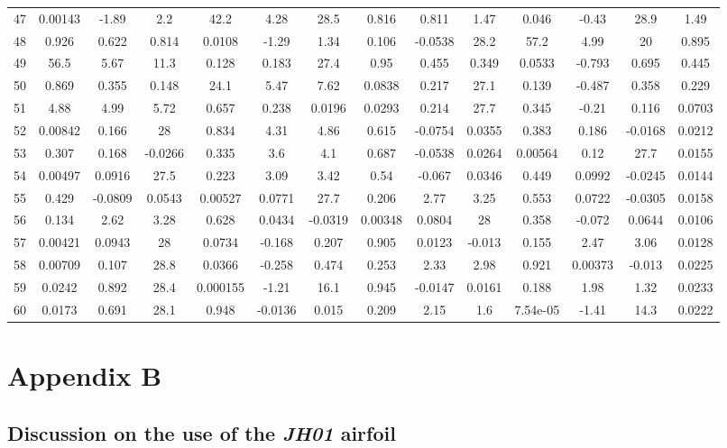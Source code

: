 \documentclass[]{aiaa-tc}%
\begin{document}
\begin{longtable}{lccccccccccccc}
47 & 0.00143 & -1.89 & 2.2 & 42.2 & 4.28 & 28.5 & 0.816 & 0.811 & 1.47 & 0.046 & -0.43 & 28.9 & 1.49\\
48 & 0.926 & 0.622 & 0.814 & 0.0108 & -1.29 & 1.34 & 0.106 & -0.0538 & 28.2 & 57.2 & 4.99 & 20 & 0.895\\
49 & 56.5 & 5.67 & 11.3 & 0.128 & 0.183 & 27.4 & 0.95 & 0.455 & 0.349 & 0.0533 & -0.793 & 0.695 & 0.445\\
50 & 0.869 & 0.355 & 0.148 & 24.1 & 5.47 & 7.62 & 0.0838 & 0.217 & 27.1 & 0.139 & -0.487 & 0.358 & 0.229\\
51 & 4.88 & 4.99 & 5.72 & 0.657 & 0.238 & 0.0196 & 0.0293 & 0.214 & 27.7 & 0.345 & -0.21 & 0.116 & 0.0703\\
52 & 0.00842 & 0.166 & 28 & 0.834 & 4.31 & 4.86 & 0.615 & -0.0754 & 0.0355 & 0.383 & 0.186 & -0.0168 & 0.0212\\
53 & 0.307 & 0.168 & -0.0266 & 0.335 & 3.6 & 4.1 & 0.687 & -0.0538 & 0.0264 & 0.00564 & 0.12 & 27.7 & 0.0155\\
54 & 0.00497 & 0.0916 & 27.5 & 0.223 & 3.09 & 3.42 & 0.54 & -0.067 & 0.0346 & 0.449 & 0.0992 & -0.0245 & 0.0144\\
55 & 0.429 & -0.0809 & 0.0543 & 0.00527 & 0.0771 & 27.7 & 0.206 & 2.77 & 3.25 & 0.553 & 0.0722 & -0.0305 & 0.0158\\
56 & 0.134 & 2.62 & 3.28 & 0.628 & 0.0434 & -0.0319 & 0.00348 & 0.0804 & 28 & 0.358 & -0.072 & 0.0644 & 0.0106\\
57 & 0.00421 & 0.0943 & 28 & 0.0734 & -0.168 & 0.207 & 0.905 & 0.0123 & -0.013 & 0.155 & 2.47 & 3.06 & 0.0128\\
58 & 0.00709 & 0.107 & 28.8 & 0.0366 & -0.258 & 0.474 & 0.253 & 2.33 & 2.98 & 0.921 & 0.00373 & -0.013 & 0.0225\\
59 & 0.0242 & 0.892 & 28.4 & 0.000155 & -1.21 & 16.1 & 0.945 & -0.0147 & 0.0161 & 0.188 & 1.98 & 1.32 & 0.0233\\
60 & 0.0173 & 0.691 & 28.1 & 0.948 & -0.0136 & 0.015 & 0.209 & 2.15 & 1.6 & 7.54e-05 & -1.41 & 14.3 & 0.0222 \\
\bottomrule
\end{longtable}
\normalsize

\section*{Appendix B}

\subsection{Discussion on the use of the \emph{JH01} airfoil}
\end{document}
